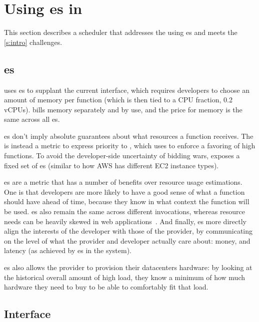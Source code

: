 \section{Using \priceclass{}es in \Sys}\label{design}

This section describes \sys{} a scheduler that addresses the
\problem{} using \priceclass{}es and meets the \autoref{s:intro}
challenges.

\subsection{\Priceclass{}es}

\Sys{} uses \class{}es to supplant the current interface, which
requires developers to choose an amount of memory per function (which
is then tied to a CPU fraction, \eg{} 0.2 vCPUs).  \Sys{} bills memory
separately and by use, and the price for memory is the same across all
\class{}es.

\Priceclass{}es don't imply absolute guarantees about what resources a
function receives.  The \priceclass{} is instead a metric to express
priority to \sys{}, which \sys{} uses to enforce a favoring of high
\class{} functions.  To avoid the developer-side uncertainty of
bidding wars, \sys{} exposes a fixed set of \priceclass{}es (similar
to how AWS has different EC2 instance types).

\Priceclass{}es are
a metric that has a number of benefits over resource usage
estimations. One is that developers are more likely to have a good
sense of what \priceclass{} a function should have ahead of time,
because they know in what context the function will be
used. \Priceclass{}es also remain the same across different
invocations, whereas resource needs can be heavily skewed in web
applications~\cite{hermod,serverless-in-the-wild}. And finally,
\class{}es more directly align the interests of the developer with
those of the provider, by communicating on the level of what the
provider and developer actually care about: money, and latency (as
achieved by \class{}es in the system).

\Priceclass{}es also allows the provider to provision their datacenters
hardware: by looking at the historical overall amount of high \priceclass{}
load, they know a minimum of how much hardware they need to buy to be able to
comfortably fit that load.

\subsection{Interface}

